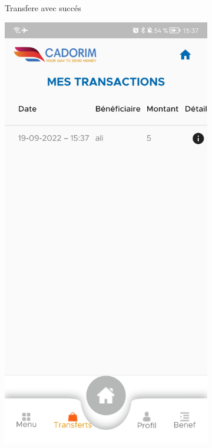 \begin{itemize}[label=$\ast$]
\begin{figure}
\begin{subfigure}[b]{0.3\textwidth}
		\caption{Transfere avec succés}
		\label{fig:y equals x}
	\end{subfigure}
	\hfill
	\begin{subfigure}[b]{0.3\textwidth}
		\centering
		\includegraphics[width=\textwidth]{./Template LaTeX/Images/17.jpg}

\end{subfigure}
\end{figure}
\end{itemize}

